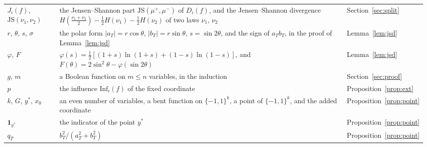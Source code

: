 \documentclass[11pt]{amsart}
\theoremstyle{remark}
\newcommand{\Inf}{\mathrm{Inf}}
\begin{document}
\begin{longtable}{@{}>{\raggedright\arraybackslash}p{}>{\raggedright\arraybackslash}p{}>{\raggedright\arraybackslash}p{}@{}}
$J_i(f)$, $\mathrm{JS}(\nu_1,\nu_2)$ & the Jensen--Shannon part $\mathrm{JS}(\mu^+,\mu^-)$ of $D_i(f)$, and the Jensen--Shannon divergence $H(\frac{\nu_1+\nu_2}2)-\frac12H(\nu_1)-\frac12H(\nu_2)$ of two laws $\nu_1$, $\nu_2$ & Section~\ref{sec:split} \\
$r$, $\theta$, $s$, $\sigma$ & the polar form $|a_T|=r\cos\theta$, $|b_T|=r\sin\theta$, $s=\sin2\theta$, and the sign of $a_Tb_T$, in the proof of Lemma~\ref{lem:jsd} & Lemma~\ref{lem:jsd} \\
$\varphi$, $F$ & $\varphi(s)=\frac12[(1+s)\ln(1+s)+(1-s)\ln(1-s)]$, and $F(\theta)=2\sin^2\theta-\varphi(\sin2\theta)$ & Lemma~\ref{lem:jsd} \\
$g$, $m$ & a Boolean function on $m\le n$ variables, in the induction & Section~\ref{sec:proof} \\
$p$ & the influence $\Inf_i(f)$ of the fixed coordinate &Proposition~\ref{prop:ext} \\
$k$, $G$, $y^*$, $x_0$ & an even number of variables, a bent function on $\{-1,1\}^k$, a point of $\{-1,1\}^k$, and the added coordinate & Proposition~\ref{prop:point} \\
$\mathbf 1_{y^*}$ & the indicator of the point $y^*$ & Proposition~\ref{prop:point} \\
$q_T$ & $b_T^2/(a_T^2+b_T^2)$ & Proposition~\ref{prop:point} \\
\bottomrule
\end{longtable}
\end{document}
